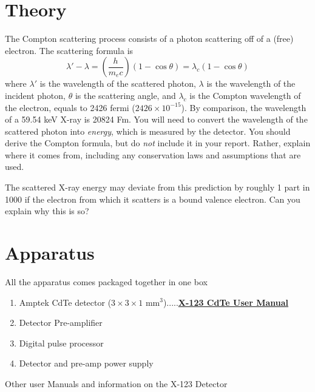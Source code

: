 \documentclass{../lab}
\begin{document}
\section{Theory}

The Compton scattering process consists of a photon scattering off of a (free) electron. The scattering formula is
\begin{equation}
    \lambda'-\lambda=\left ( \frac{h}{m_ec}\right)\left (1-\cos{\theta}\right )=\lambda_c(1-\cos{\theta})
\end{equation}
where $\lambda'$ is the wavelength of the scattered photon, $\lambda$ is the wavelength of the incident photon, $\theta$ is the scattering angle, and $\lambda_c$ is the Compton wavelength of the electron, equals to 2426 fermi ($2426 \times 10^{-15}$). By comparison, the wavelength of a 59.54 keV X-ray is 20824 Fm. You will need to convert the wavelength of the scattered photon into \emph{energy}, which is measured by the detector. You should derive the Compton formula, but do \emph{not} include it in your report. Rather, explain where it comes from, including any conservation laws and assumptions that are used.

The scattered X-ray energy may deviate from this prediction by roughly 1 part in 1000 if the electron from which it scatters is a bound valence electron. Can you explain why this is so?

\section{Apparatus}

All the apparatus comes packaged together in one box

\begin{enumerate}
    \item Amptek CdTe detector ($3 \times 3 \times 1$ mm$^{3}$).....\href{http://experimentationlab.berkeley.edu/sites/default/files/images/X-123\_CdTe\_User\_Manual.pdf}{\textbf{X-123 CdTe User Manual}}

    \item Detector Pre-amplifier

    \item Digital pulse processor

    \item Detector and pre-amp power supply

\end{enumerate}

Other user Manuals and information on the X-123 Detector
\end{document}
